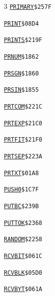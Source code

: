\begin{multicols}{3}
\noindent\hyperlink{l:PRIMARY}{\texttt{PRIMARY}}\hfill\texttt{\$257F~\phantom{000}\llap{\pageref{l:PRIMARY}}}\par
\noindent\hyperlink{l:PRINT}{\texttt{PRINT}}\hfill\texttt{\$08D4~\phantom{000}\llap{\pageref{l:PRINT}}}\par
\noindent\hyperlink{l:PRINTS}{\texttt{PRINTS}}\hfill\texttt{\$219F~\phantom{000}\llap{\pageref{l:PRINTS}}}\par
\noindent\hyperlink{l:PRNUM}{\texttt{PRNUM}}\hfill\texttt{\$1862~\phantom{000}\llap{\pageref{l:PRNUM}}}\par
\noindent\hyperlink{l:PRSGN}{\texttt{PRSGN}}\hfill\texttt{\$1860~\phantom{000}\llap{\pageref{l:PRSGN}}}\par
\noindent\hyperlink{l:PRSIN}{\texttt{PRSIN}}\hfill\texttt{\$1855~\phantom{000}\llap{\pageref{l:PRSIN}}}\par
\noindent\hyperlink{l:PRTCOM}{\texttt{PRTCOM}}\hfill\texttt{\$221C~\phantom{000}\llap{\pageref{l:PRTCOM}}}\par
\noindent\hyperlink{l:PRTEXP}{\texttt{PRTEXP}}\hfill\texttt{\$21C0~\phantom{000}\llap{\pageref{l:PRTEXP}}}\par
\noindent\hyperlink{l:PRTFIT}{\texttt{PRTFIT}}\hfill\texttt{\$21F0~\phantom{000}\llap{\pageref{l:PRTFIT}}}\par
\noindent\hyperlink{l:PRTSEP}{\texttt{PRTSEP}}\hfill\texttt{\$223A~\phantom{000}\llap{\pageref{l:PRTSEP}}}\par
\noindent\hyperlink{l:PRTXT}{\texttt{PRTXT}}\hfill\texttt{\$01A8~\phantom{000}\llap{\pageref{l:PRTXT}}}\par
\noindent\hyperlink{l:PUSH0}{\texttt{PUSH0}}\hfill\texttt{\$1C7F~\phantom{000}\llap{\pageref{l:PUSH0}}}\par
\noindent\hyperlink{l:PUTBC}{\texttt{PUTBC}}\hfill\texttt{\$239B~\phantom{000}\llap{\pageref{l:PUTBC}}}\par
\noindent\hyperlink{l:PUTTOK}{\texttt{PUTTOK}}\hfill\texttt{\$2368~\phantom{000}\llap{\pageref{l:PUTTOK}}}\par
\noindent\hyperlink{l:RANDOM}{\texttt{RANDOM}}\hfill\texttt{\$2258~\phantom{000}\llap{\pageref{l:RANDOM}}}\par
\noindent\hyperlink{l:RCVBIT}{\texttt{RCVBIT}}\hfill\texttt{\$061C~\phantom{000}\llap{\pageref{l:RCVBIT}}}\par
\noindent\hyperlink{l:RCVBLK}{\texttt{RCVBLK}}\hfill\texttt{\$05D0~\phantom{000}\llap{\pageref{l:RCVBLK}}}\par
\noindent\hyperlink{l:RCVBYT}{\texttt{RCVBYT}}\hfill\texttt{\$061A~\phantom{000}\llap{\pageref{l:RCVBYT}}}\par

\end{multicols}
